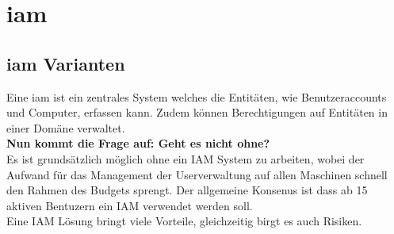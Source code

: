 \chapter{\acrfull{iam}}

\section{\acrshort{iam} Varianten}
Eine \acrfull{iam} ist ein zentrales System welches die Entitäten, wie Benutzeraccounts und Computer, erfassen kann. Zudem können Berechtigungen auf Entitäten in einer Domäne verwaltet.\\

\textbf{Nun kommt die Frage auf: Geht es nicht ohne?}\\
Es ist grundsätzlich möglich ohne ein IAM System zu arbeiten, wobei der Aufwand für das Management der Userverwaltung auf allen Maschinen schnell den Rahmen des Budgets sprengt.
Der allgemeine Konsenus ist dass ab 15 aktiven Bentuzern ein IAM verwendet werden soll.\\

Eine IAM Lösung bringt viele Vorteile, gleichzeitig birgt es auch Risiken.\\

